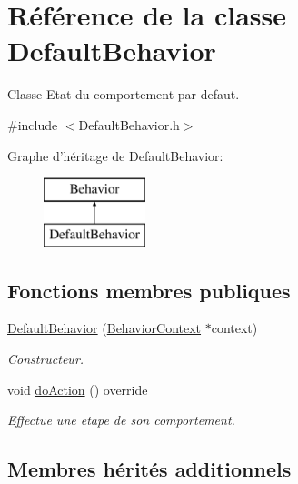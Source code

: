 \hypertarget{class_default_behavior}{\section{Référence de la classe Default\-Behavior}
\label{class_default_behavior}
}


Classe Etat du comportement par defaut.  




{\ttfamily \#include $<$Default\-Behavior.\-h$>$}

Graphe d'héritage de Default\-Behavior\-:\begin{figure}[H]
\begin{center}
\leavevmode
\includegraphics[height=2.000000cm]{class_default_behavior}
\end{center}
\end{figure}
\subsection*{Fonctions membres publiques}
{\bf }\par
\begin{DoxyCompactItemize}
\item 
\hyperlink{class_default_behavior_a8963f21041fd7c653042b40ad81452b1}{Default\-Behavior} (\hyperlink{class_behavior_context}{Behavior\-Context} $\ast$context)
\begin{DoxyCompactList}\small\item\em Constructeur. \end{DoxyCompactList}\item 
void \hyperlink{class_default_behavior_a081682eb85139bf45080ff0787ccd8ca}{do\-Action} () override
\begin{DoxyCompactList}\small\item\em Effectue une etape de son comportement. \end{DoxyCompactList}\end{DoxyCompactItemize}

\subsection*{Membres hérités additionnels}


